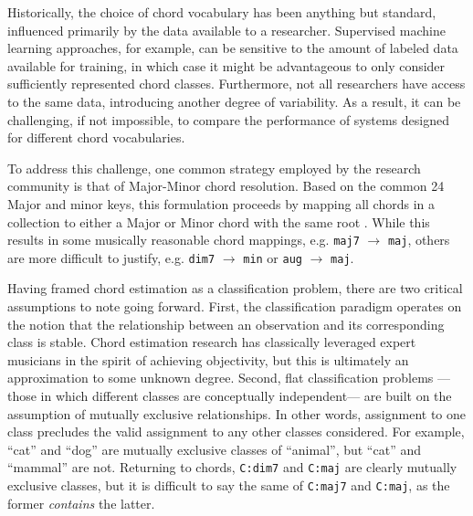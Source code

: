 Historically, the choice of chord vocabulary has been anything but standard, influenced primarily by the data available to a researcher.
Supervised machine learning approaches, for example, can be sensitive to the amount of labeled data available for training, in which case it might be advantageous to only consider sufficiently represented chord classes.
Furthermore, not all researchers have access to the same data, introducing another degree of variability.
As a result, it can be challenging, if not impossible, to compare the performance of systems designed for different chord vocabularies.

To address this challenge, one common strategy employed by the research community is that of Major-Minor chord resolution.
Based on the common 24 Major and minor keys, this formulation proceeds by mapping all chords in a collection to either a Major or Minor chord with the same root \cite{McVicar2013}.
While this results in some musically reasonable chord mappings, e.g. \texttt{maj7} $\to$ \texttt{maj}, others are more difficult to justify, e.g. \texttt{dim7} $\to$ \texttt{min} or \texttt{aug} $\to$ \texttt{maj}.

Having framed chord estimation as a classification problem, there are two critical assumptions to note going forward.
First, the classification paradigm operates on the notion that the relationship between an observation and its corresponding class is stable.
Chord estimation research has classically leveraged expert musicians in the spirit of achieving objectivity, but this is ultimately an approximation to some unknown degree.
Second, flat classification problems ---those in which different classes are conceptually independent--- are built on the assumption of mutually exclusive relationships.
In other words, assignment to one class precludes the valid assignment to any other classes considered.
For example, ``cat'' and ``dog'' are mutually exclusive classes of ``animal'', but ``cat'' and ``mammal'' are not.
Returning to chords, \texttt{C:dim7} and \texttt{C:maj} are clearly mutually exclusive classes, but it is difficult to say the same of \texttt{C:maj7} and \texttt{C:maj}, as the former \emph{contains} the latter.


